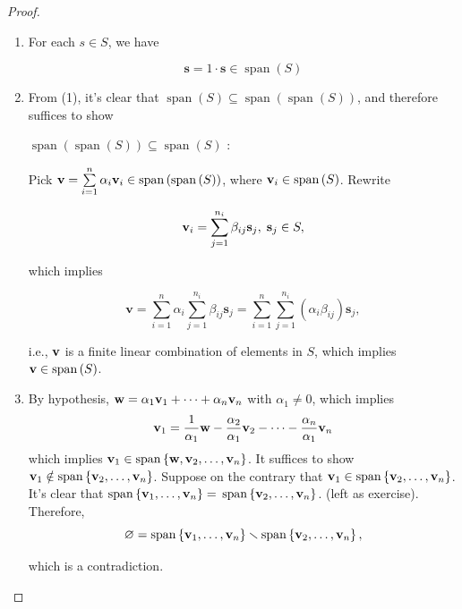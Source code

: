 \begin{proof} 
\begin{enumerate}
    \item For each \(s \in  S\), we have

\[
\mathbf{s} = 1 \cdot  \mathbf{s} \in  \operatorname{span}\left( S\right)
\]

    \item From (1), it’s clear that \(\operatorname{span}\left( S\right)  \subseteq  \operatorname{span}\left( {\operatorname{span}\left( S\right) }\right)\), and therefore suffices to show

\(\operatorname{span}\left( {\operatorname{span}\left( S\right) }\right)  \subseteq  \operatorname{span}\left( S\right)\) :

Pick \(\mathbf{v} = \mathop{\sum }\limits_{{i = 1}}^n\alpha_{i}{\bf v}_{i} \in  \operatorname{span}\left( {\operatorname{span}\left( S\right) }\right)\), where \({\bf v}_{i} \in  \operatorname{span}\left( S\right)\). Rewrite

\[
{\bf v}_{i} = \mathop{\sum }\limits_{{j = 1}}^{n_{i}}\beta_{ij}{\mathbf{s}}_{j},\;{\mathbf{s}}_{j} \in  S,
\]

which implies

\[
\mathbf{v} = \mathop{\sum }\limits_{{i = 1}}^n\alpha_{i}\mathop{\sum }\limits_{{j = 1}}^{n_{i}}\beta_{ij}{\mathbf{s}}_{j} = \mathop{\sum }\limits_{{i = 1}}^n\mathop{\sum }\limits_{{j = 1}}^{n_{i}}\left( {\alpha_{i}\beta_{ij}}\right) {\mathbf{s}}_{j},
\]

i.e., \(\bf v\) is a finite linear combination of elements in \(S\), which implies \({\bf v} \in  \operatorname{span}\left( S\right)\).

    \item  By hypothesis, \(\mathbf{w} = \alpha_1{\bf v}_1 + \cdots  + \alpha_n{\bf v}_n\) with \(\alpha_1 \neq  0\), which implies
    \[
    {\bf v}_1 = \frac{1}{\alpha_1}\mathbf{w} - \frac{\alpha_2}{\alpha_1}{\bf v}_2 - \cdots - \frac{\alpha_n}{\alpha_1}{\bf v}_n
    \]
    which implies \({\bf v}_1 \in  \operatorname{span}\left\{  {\mathbf{w},{\bf v}_2,\ldots ,{\bf v}_n}\right\}\). It suffices to show \({\bf v}_1 \notin  \operatorname{span}\left\{  {{\bf v}_2,\ldots ,{\bf v}_n}\right\}\). Suppose on the contrary that \({\bf v}_1 \in  \operatorname{span}\left\{  {{\bf v}_2,\ldots ,{\bf v}_n}\right\}\). It’s clear that \(\operatorname{span}\left\{  {{\bf v}_1,\ldots ,{\bf v}_n}\right\}   =\)  \(\operatorname{span}\left\{  {{\bf v}_2,\ldots ,{\bf v}_n}\right\}\). (left as exercise). Therefore,
    \[
    \varnothing  = \operatorname{span}\left\{  {{\bf v}_1,\ldots ,{\bf v}_n}\right\}   \smallsetminus  \operatorname{span}\left\{  {{\bf v}_2,\ldots ,{\bf v}_n}\right\}  ,
    \]
    
    which is a contradiction.
\end{enumerate}

\end{proof}

